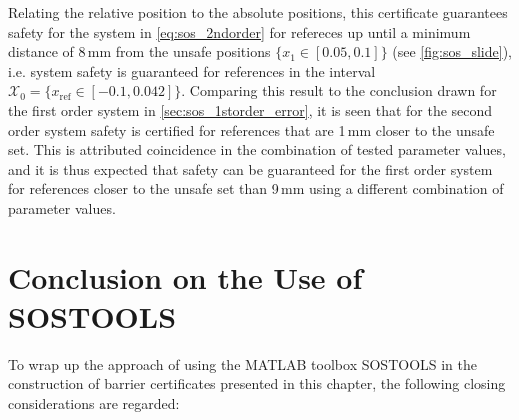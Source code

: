 Relating the relative position to the absolute positions, this certificate guarantees safety for the system in \autoref{eq:sos_2ndorder} for refereces up until a minimum distance of 8\,mm from the unsafe positions $\{x_1\in[0.05,0.1] \}$ (see \autoref{fig:sos_slide}), i.e. system safety is guaranteed for references in the interval $\mathcal{X}_0=\{x_\text{ref}\in[-0.1,0.042] \}$. Comparing this result to the conclusion drawn for the first order system in \autoref{sec:sos_1storder_error}, it is seen that for the second order system safety is certified for references that are 1\,mm closer to the unsafe set. This is attributed coincidence in the combination of tested parameter values, and it is thus expected that safety can be guaranteed for the first order system for references closer to the unsafe set than 9\,mm using a different combination of parameter values.



\section{Conclusion on the Use of SOSTOOLS}\label{sec:sos_conclusion}

To wrap up the approach of using the MATLAB toolbox SOSTOOLS in the construction of barrier certificates presented in this chapter, the following closing considerations are regarded:


